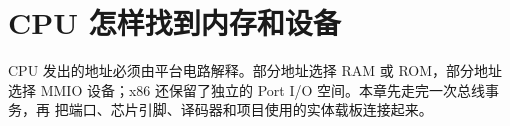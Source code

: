 \chapter{CPU 怎样找到内存和设备}

CPU 发出的地址必须由平台电路解释。部分地址选择 RAM 或 ROM，部分地址选择
MMIO 设备；x86 还保留了独立的 Port I/O 空间。本章先走完一次总线事务，再
把端口、芯片引脚、译码器和项目使用的实体载板连接起来。






